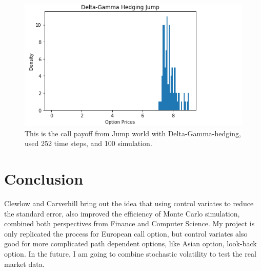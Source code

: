 \documentclass[11pt,]{article}
\makeatletter
\def\maxwidth{\ifdim\Gin@nat@width>\linewidth\linewidth
\else\Gin@nat@width\fi}
\let\Oldincludegraphics\includegraphics
\renewcommand{\includegraphics}[1]{\Oldincludegraphics[width=\maxwidth]{#1}}
\makeatother
\begin{document}
\begin{figure}
\centering
\includegraphics{images/DeltaGammaHedgingJump.PNG}
\caption{This is the call payoff from Jump world with
Delta-Gamma-hedging, used 252 time steps, and 100 simulation.}
\end{figure}

\hypertarget{conclusion}{%
\section{Conclusion}\label{conclusion}}

Clewlow and Carverhill bring out the idea that using control variates to
reduce the standard error, also improved the efficiency of Monte Carlo
simulation, combined both perspectives from Finance and Computer
Science. My project is only replicated the process for European call
option, but control variates also good for more complicated path
dependent options, like Asian option, look-back option. In the future, I
am going to combine stochastic volatility to test the real market data.

\newpage
\singlespacing 

\end{document}
